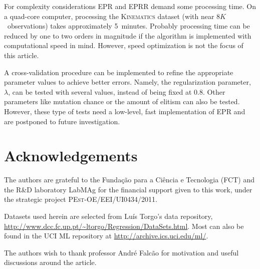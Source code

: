 \documentclass[times,review,preprint]{elsarticle}
\begin{document}
For complexity considerations \ac{EPR} and \ac{EPRR} demand some processing time. On a quad-core computer, processing the \textsc{Kinematics} dataset (with near $8K$~observations) takes approximately 5~minutes. Probably processing time can be reduced by one to two orders in magnitude if the algorithm is implemented with computational speed in mind. However, speed optimization is not the focus of this article.

A cross-validation procedure can be implemented to refine the appropriate parameter values to achieve better errors. Namely, the regularization parameter, $\lambda$, can be tested with several values, instead of being fixed at $0.8$. Other parameters like mutation chance or the amount of elitism can also be tested. However, these type of tests need a low-level, fast implementation of \ac{EPR} and are postponed to future investigation.

\section*{Acknowledgements}

The authors are grateful to the Fundação para a Ciência e Tecnologia (FCT) and the  R\&D laboratory LabMAg for the financial support given to this work, under the strategic project \textsc{PEst-OE/EEI/UI0434/2011}.

Datasets used herein are selected from Luís Torgo's data repository, \url{http://www.dcc.fc.up.pt/~ltorgo/Regression/DataSets.html}. Most can also be found in the UCI ML repository at \url{http://archive.ics.uci.edu/ml/}.

The authors wish to thank professor André Falcão for motivation and useful discussions around the article.



    
\end{document}
